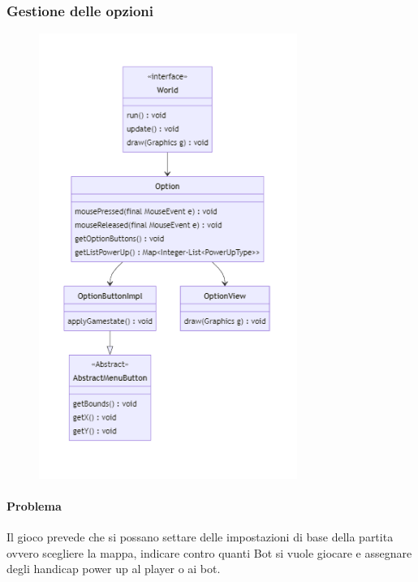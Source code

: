 \documentclass[a4paper,12pt]{report}
\begin{document}
\subsubsection{Gestione delle opzioni}

\begin{figure}[H]
    \centering{}
    \includegraphics[width=0.75\textwidth]{img/UMLGestioneOpzioni.png}
    \caption{}
\end{figure}

\paragraph{Problema} Il gioco prevede che si possano settare delle impostazioni di base della partita ovvero scegliere la mappa, indicare contro quanti Bot si vuole giocare e assegnare degli handicap power up al player o ai bot.
\end{document}
